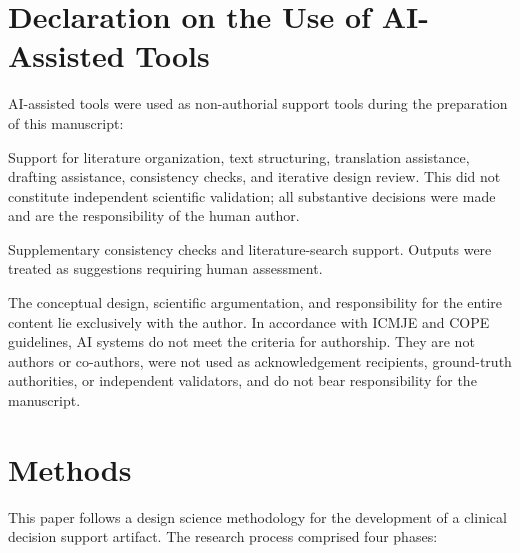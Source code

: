 \documentclass[11pt,a4paper]{article}
\begin{document}
\newpage
\tableofcontents
\newpage

\section*{Declaration on the Use of AI-Assisted Tools}

AI-assisted tools were used as non-authorial support tools during the preparation of this manuscript:

\begin{description}[style=nextline, leftmargin=2cm]
\item[\textbf{Claude Opus 4.6} (Anthropic)] Support for literature organization, text structuring, translation assistance, drafting assistance, consistency checks, and iterative design review. This did not constitute independent scientific validation; all substantive decisions were made and are the responsibility of the human author.
\item[\textbf{Gemini} (Google DeepMind) \& \textbf{Copilot} (Microsoft)] Supplementary consistency checks and literature-search support. Outputs were treated as suggestions requiring human assessment.
\end{description}

\noindent The conceptual design, scientific argumentation, and responsibility for the entire content lie exclusively with the author. In accordance with ICMJE and COPE guidelines, AI systems do not meet the criteria for authorship. They are not authors or co-authors, were not used as acknowledgement recipients, ground-truth authorities, or independent validators, and do not bear responsibility for the manuscript.

\newpage

\section{Methods}

This paper follows a design science methodology for the development of a clinical decision support artifact. The research process comprised four phases:
\end{document}
